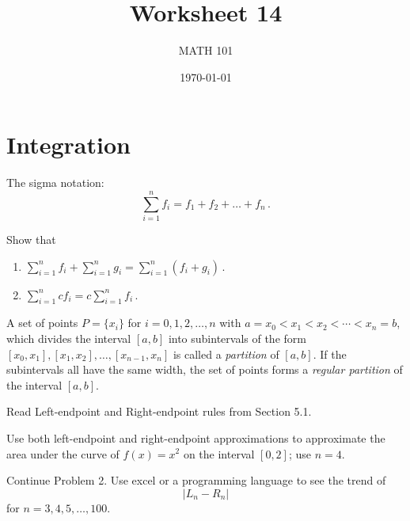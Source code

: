 \documentclass[12pt]{amsart}
\title{ Worksheet 14}
\author{MATH 101}
\date{\today}
\begin{document}
\maketitle



\section*{Integration}

\begin{definition}
	The sigma notation:
	\begin{equation*}
		\sum_{i=1}^n f_i = f_1 + f_2 + \dots + f_n \,.
	\end{equation*}
\end{definition}

\begin{problem}
Show that
\begin{enumerate}
	\item $\displaystyle \sum_{i=1}^n f_i + \sum_{i=1}^n g_i = \sum_{i=1}^n (f_i + g_i) \,.$
	      \vspace{7cm}
	\item $\displaystyle  \sum_{i=1}^n c f_i = c \sum_{i=1}^n f_i \,.$
	      \vspace{7cm}
\end{enumerate}
\end{problem}

\begin{definition}
	A set of points \( P = \{ x_i \} \) for \( i = 0, 1, 2, \dots, n \) with \( a = x_0 < x_1 < x_2 < \cdots < x_n = b \), which divides the interval \( [a, b] \) into subintervals of the form \( [x_0, x_1] , [x_1, x_2] , \dots, [x_{n-1}, x_n] \) is called a \textit{partition} of \( [a, b] \). If the subintervals all have the same width, the set of points forms a \textit{regular partition} of the interval \( [a, b] \).
\end{definition}

\begin{problem}[Rules]
Read Left-endpoint and Right-endpoint rules from Section 5.1.

Use both left-endpoint and right-endpoint approximations to approximate the area under the curve of \( f(x) = x^2 \) on the interval \( [0, 2] \); use \( n = 4 \).
\vspace{5cm}
\end{problem}

\begin{problem}
Continue Problem 2. Use excel or a programming language to see the trend of
\begin{equation*}
	| L_n - R_n |
\end{equation*}
for $n = 3,4,5,\dots, 100$.
\vspace{7cm}
\end{problem}
\end{document}
